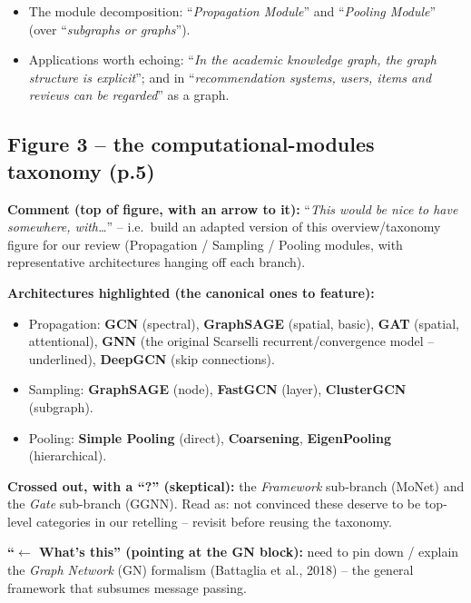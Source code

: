 \begin{itemize}
    \item The module decomposition: ``\emph{Propagation Module}'' and
        ``\emph{Pooling Module}'' (over ``\emph{subgraphs or graphs}'').
    \item Applications worth echoing: ``\emph{In the academic knowledge graph,
        the graph structure is explicit}''; and in ``\emph{recommendation
        systems, users, items and reviews can be regarded}'' as a graph.
\end{itemize}

\subsection*{Figure 3 -- the computational-modules taxonomy (p.5)}

\textbf{Comment (top of figure, with an arrow to it):} ``\emph{This would be
nice to have somewhere, with\ldots}'' -- i.e.\ build an adapted version of this
overview/taxonomy figure for our review (Propagation / Sampling / Pooling
modules, with representative architectures hanging off each branch).

\textbf{Architectures highlighted (the canonical ones to feature):}
\begin{itemize}
    \item Propagation: \textbf{GCN} (spectral), \textbf{GraphSAGE} (spatial,
        basic), \textbf{GAT} (spatial, attentional), \textbf{GNN} (the original
        Scarselli recurrent/convergence model -- underlined), \textbf{DeepGCN}
        (skip connections).
    \item Sampling: \textbf{GraphSAGE} (node), \textbf{FastGCN} (layer),
        \textbf{ClusterGCN} (subgraph).
    \item Pooling: \textbf{Simple Pooling} (direct), \textbf{Coarsening},
        \textbf{EigenPooling} (hierarchical).
\end{itemize}

\textbf{Crossed out, with a ``?'' (skeptical):} the \emph{Framework} sub-branch
(MoNet) and the \emph{Gate} sub-branch (GGNN). Read as: not convinced these
deserve to be top-level categories in our retelling -- revisit before reusing
the taxonomy.

\textbf{``$\leftarrow$ What's this'' (pointing at the GN block):} need to pin
down / explain the \emph{Graph Network} (GN) formalism (Battaglia et al., 2018)
-- the general framework that subsumes message passing.

